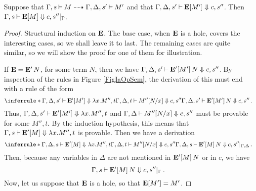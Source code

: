 \documentclass[11pt]{report}
\begin{document}
\begin{lemma}
  Suppose that $\Gamma,s\mathbin{\vdash} M \dashrightarrow \Gamma,\Delta,s'\mathbin{\vdash} M'$ and that $\Gamma,\Delta,s'\mathbin{\vdash} {\mathbf{E}}[M'] \Downarrow c,s''$.  
  Then $\Gamma,s\mathbin{\vdash} {\mathbf{E}}[M]\Downarrow c,s''\vert_\Gamma$.
  \label{LemSmallToBig}
\end{lemma}
\begin{proof}
  Structural induction on ${\mathbf{E}}$.
  The base case, when ${\mathbf{E}}$ is a hole, covers the interesting cases, so we shall leave it to last.
  The remaining cases are quite similar, so we will show the proof for one of them for illustration.

  If ${\mathbf{E}}={\mathbf{E}}'\,N$, for some term $N$, then we have $\Gamma,\Delta,s'\mathbin{\vdash} {\mathbf{E}}'[M']\,N\Downarrow c,s''$.  
  By inspection of the rules in Figure \ref{FigIaOpSem}, the derivation of this must end with a rule of the form
  \[
    \inferrule*{\Gamma,\Delta,s'\ts \EE'[M'] \converges \lambda x.M'',t \\ \Gamma,\Delta,t \ts M''[N/x] \converges c,s''}
    {\Gamma,\Delta,s'\ts \EE'[M']\,N \converges c,s''}\,.
    \]
  Thus, $\Gamma,\Delta,s'\mathbin{\vdash} {\mathbf{E}}'[M']\Downarrow \lambda x.M'',t$ and $\Gamma,\Delta\mathbin{\vdash} M''[N/x]\Downarrow c,s''$ must be provable for some $M'',t$.
  By the induction hypothesis, this means that $\Gamma,s\mathbin{\vdash} {\mathbf{E}}'[M]\Downarrow \lambda x.M'',t$ is provable.
  Then we have a derivation
  \[
    \inferrule*{\Gamma,\Delta,s\ts \EE'[M] \converges \lambda x.M'',t \\ \Gamma,\Delta,t \ts M''[N/x] \converges c,s''}
    {\Gamma,\Delta,s\ts \EE'[M]\,N\converges c,s''\vert_{\Gamma,\Delta}}\,.
    \]
  Then, because any variables in $\Delta$ are not mentioned in ${\mathbf{E}}'[M]\,N$ or in $c$, we have
  \[
    \Gamma,s\mathbin{\vdash} {\mathbf{E}}'[M]\,N\Downarrow c,s''\vert_\Gamma\,.
    \]
  Now, let us suppose that ${\mathbf{E}}$ is a hole, so that ${\mathbf{E}}[M']=M'$.  


\end{proof}
\end{document}
